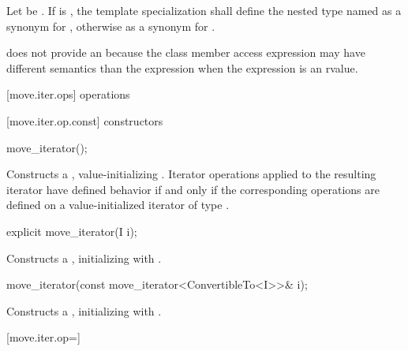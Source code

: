 \pnum
Let  be . If 
is , the template specialization  shall define the nested
type named  as a synonym for , otherwise
as a synonym for .

\pnum
\enternote {} does not provide an  because the class member access
expression  may have different semantics than the expression
 when the expression  is an rvalue.\exitnote

[move.iter.ops]{ operations}

[move.iter.op.const]{ constructors}

%
\begin{itemdecl}
move_iterator();
\end{itemdecl}

\begin{itemdescr}
\pnum
\effects Constructs a , value-initializing
. Iterator operations applied to the resulting
iterator have defined behavior if and only if the corresponding operations are defined
on a value-initialized iterator of type .
\end{itemdescr}


%
\begin{itemdecl}
explicit move_iterator(I i);
\end{itemdecl}

\begin{itemdescr}
\pnum
\effects Constructs a , initializing
 with .
\end{itemdescr}


%
\begin{itemdecl}
move_iterator(const move_iterator<ConvertibleTo<I>>& i);
\end{itemdecl}

\begin{itemdescr}
\pnum
\effects Constructs a , initializing
 with .
\end{itemdescr}

[move.iter.op=]{}

